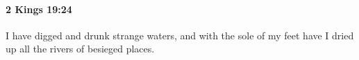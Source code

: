 
		\paragraph{2 Kings 19:24} %
			\label{2KINGS-19-24}

			I have digged and drunk strange waters, and with the sole of my feet have I dried up all the rivers of besieged places.


